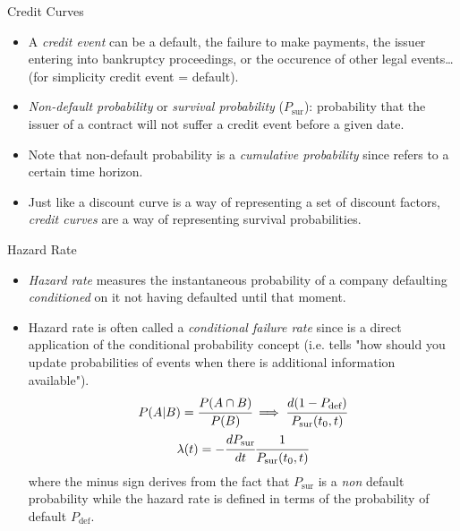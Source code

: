 \documentclass{beamer}
\begin{document}
\begin{frame}{Credit Curves}
\begin{itemize}
    \item A \emph{credit event} can be a default, the failure to make payments, the issuer entering into bankruptcy proceedings, or the occurence of other legal events\dots (for simplicity credit event = default).
    \item \emph{Non-default probability} or \emph{survival probability} ($P_{\textrm{sur}}$): probability that the issuer of a contract will not suffer a credit event before a given date. 
    \item Note that non-default probability is a \emph{cumulative probability} since refers to a certain time horizon. 
    \item Just like a discount curve is a way of representing a set of discount factors, \emph{credit curves} are a way of representing survival probabilities.
\end{itemize}
\end{frame}

\begin{frame}{Hazard Rate}
	\begin{itemize}
		\item \emph{Hazard rate} measures the instantaneous probability of a company defaulting \emph{conditioned} on it not having defaulted until that moment.
		\item Hazard rate is often called a \emph{conditional failure rate} since is a direct application of the conditional probability concept (i.e. tells "how should you update probabilities of events when there is additional information available"). 
		\begin{gather*}
		P(A|B) = \cfrac{P(A\cap B)}{P(B)} \implies \cfrac{d(1-P_{\textrm{def}})}{P_{\textrm{sur}}(t_0, t)} \\
		\lambda(t) = -\cfrac{dP_{\textrm{sur}}}{dt}\cfrac{1}{P_{\textrm{sur}}(t_0, t)}
		\end{gather*}
		where the minus sign derives from the fact that $P_{\textrm{sur}}$ is a \emph{non} default probability while the hazard rate is defined in terms of the probability of default $P_{\textrm{def}}$.
	\end{itemize}
\end{frame}
\end{document}
